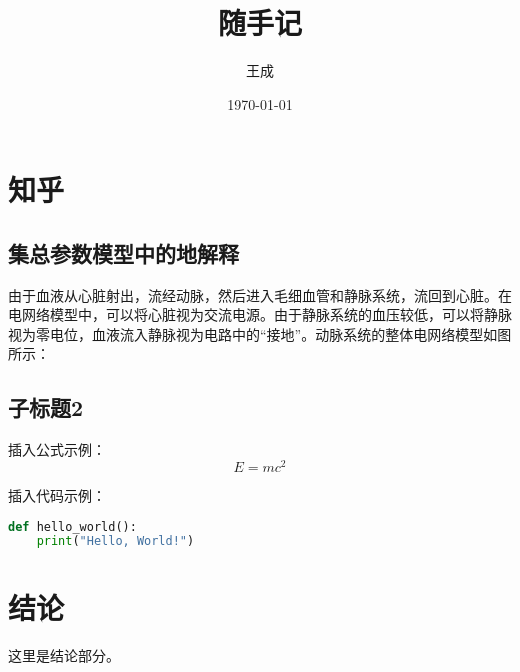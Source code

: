 \documentclass[12pt,a4paper]{article} %
\title{随手记} %
\author{王成} %
\date{\today} %
\begin{document}
\maketitle %

\section{知乎}
\subsection{集总参数模型中的地解释}
\colorbox{yellow!20}{
    \parbox{\dimexpr\linewidth-2\fboxsep}{
        由于血液从心脏射出，流经动脉，然后进入毛细血管和静脉系统，流回到心脏。在电网络模型中，可以将心脏视为交流电源。由于静脉系统的血压较低，可以将静脉视为零电位，血液流入静脉视为电路中的“接地”。动脉系统的整体电网络模型如图所示：
    }
}

\subsection{子标题2}
插入公式示例：
\begin{equation}
    E = mc^2
\end{equation}



插入代码示例：
\begin{lstlisting}[language=Python, caption=Python代码示例]
def hello_world():
    print("Hello, World!")
\end{lstlisting}

\section{结论}
这里是结论部分。
\end{document}
